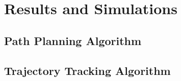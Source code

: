 \documentclass[11pt, a4paper]{article}
\begin{document}







\section{Results and Simulations}
  \subsection{Path Planning Algorithm}
  \subsection{Trajectory Tracking Algorithm}


\end{document}
